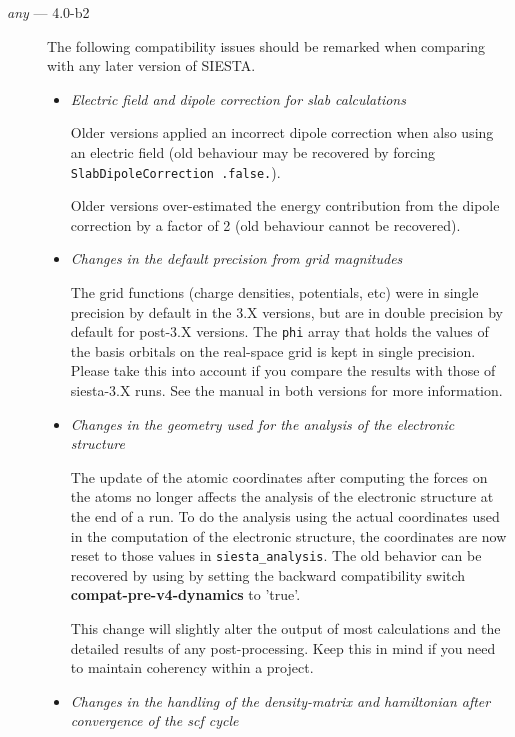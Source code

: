 \documentclass{article}
\newcommand\siesta{\textsc{SIESTA}}
\newcommand{\opt}[1]{\textbf{#1}}
\newcommand{\code}[1]{\texttt{#1}}
\begin{document}
\begin{description}
  \item[\emph{any} --- 4.0-b2] The following compatibility issues should be remarked when
  comparing with any later version of \siesta.

  \begin{itemize}
    \item \emph{Electric field and dipole correction for slab calculations}

    Older versions applied an incorrect dipole correction when also using an
    electric field (old behaviour may be recovered by forcing \code{SlabDipoleCorrection .false.}). 

    Older versions over-estimated the energy contribution from the dipole correction by a
    factor of 2 (old behaviour cannot be recovered).

  \item\emph{Changes in the default precision from grid magnitudes}

    The grid functions (charge densities, potentials, etc) were in
    single precision by default in the 3.X versions, but are in double
    precision by default for post-3.X versions. The \code{phi}  array that
    holds the values of the basis orbitals on the real-space grid is kept in
    single precision. Please take this into account if you compare the
    results with those of siesta-3.X runs. See the manual in both
    versions for more information.

  \item\emph{Changes in the geometry used for the analysis of the
    electronic structure}

  The update of the atomic coordinates after computing the forces on
  the atoms no longer affects the analysis of the electronic
  structure at the end of a run. To do the analysis using the actual
  coordinates used in the computation of the electronic structure, the
  coordinates are now reset to those values in \code{siesta\_analysis}.  The old
  behavior can be recovered by using by setting the backward
  compatibility switch \opt{compat-pre-v4-dynamics} to 'true'.

  This change will slightly alter the output of most calculations and the
  detailed results of any post-processing. Keep this in mind if you
  need to maintain coherency within a project.


  \item\emph{Changes in the handling of the density-matrix and
    hamiltonian after convergence of the scf cycle}


\end{itemize}
\end{description}
\end{document}
